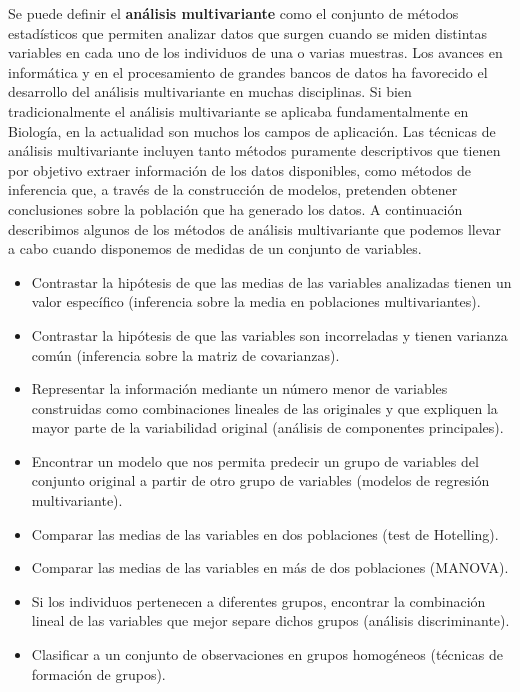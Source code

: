 \documentclass[
  a4paper,
  oneside]{scrbook}
\providecommand{\tightlist}{%
  \setlength{\itemsep}{0pt}\setlength{\parskip}{0pt}}
\theoremstyle{definition}
\theoremstyle{definition}
\theoremstyle{definition}
\theoremstyle{definition}
\theoremstyle{remark}
\begin{document}
Se puede definir el \textbf{análisis multivariante} como el conjunto de métodos estadísticos que permiten analizar datos que surgen cuando se miden distintas variables en cada uno de los individuos de una o varias muestras.
Los avances en informática y en el procesamiento de grandes bancos de
datos ha favorecido el desarrollo del análisis multivariante en muchas disciplinas. Si bien tradicionalmente el análisis multivariante se aplicaba fundamentalmente en Biología, en la actualidad son muchos los campos de aplicación.
Las técnicas de análisis multivariante incluyen tanto métodos puramente descriptivos que tienen por objetivo extraer información de los datos disponibles, como métodos de inferencia que, a través de la construcción de modelos, pretenden obtener conclusiones sobre la población que ha generado los datos. A continuación describimos algunos de los métodos de análisis multivariante que podemos llevar a cabo cuando disponemos de medidas de un conjunto de variables.

\begin{itemize}
\tightlist
\item
  Contrastar la hipótesis de que las medias de las variables analizadas tienen un valor específico (inferencia sobre la media en poblaciones multivariantes).
\item
  Contrastar la hipótesis de que las variables son incorreladas y tienen varianza común (inferencia sobre la matriz de covarianzas).
\item
  Representar la información mediante un número menor de variables construidas como combinaciones lineales de las originales y que expliquen la mayor parte de la variabilidad original (análisis de componentes principales).
\item
  Encontrar un modelo que nos permita predecir un grupo de variables del conjunto original a partir de otro grupo de variables (modelos de regresión multivariante).
\item
  Comparar las medias de las variables en dos poblaciones (test de Hotelling).
\item
  Comparar las medias de las variables en más de dos poblaciones (MANOVA).
\item
  Si los individuos pertenecen a diferentes grupos, encontrar la combinación lineal de las variables que mejor separe dichos grupos (análisis discriminante).
\item
  Clasificar a un conjunto de observaciones en grupos homogéneos (técnicas de formación de grupos).
\end{itemize}
\end{document}
